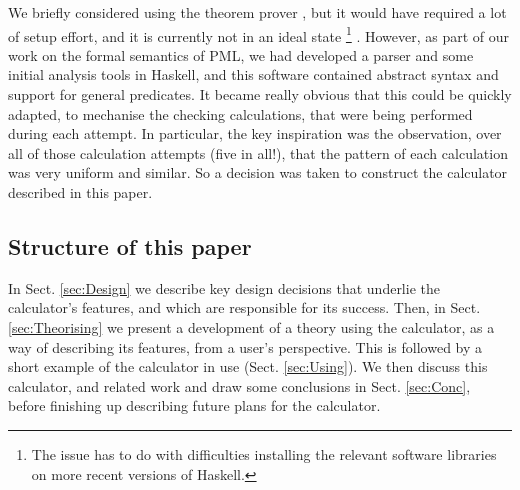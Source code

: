We briefly considered using the  theorem prover
\cite{DBLP:conf/utp/Butterfield10,DBLP:conf/utp/Butterfield12},
but it would have required a lot of setup effort,
and it is currently not in an ideal state%
\footnote{The issue has to do with difficulties installing
the relevant software libraries
on more recent versions of Haskell.}
.
However, as part of our work on the formal semantics of PML,
we had developed a parser and some initial analysis tools
in Haskell\cite{Haskell2010},
and this software contained abstract syntax and support
for general predicates.
It became really obvious that this could be quickly adapted,
to mechanise the checking calculations, that were being performed
during each attempt.
In particular,
the key inspiration was the observation,
over all of those calculation attempts (five in all!),
that the pattern of each calculation was very uniform and similar.
So a decision was taken to construct the calculator described in this paper.



\subsection{Structure of this paper}

In Sect. \ref{sec:Design}
we describe key design decisions
that underlie the calculator's features,
and which are responsible for its success.
Then, in Sect. \ref{sec:Theorising}
we present a development of a theory using the calculator,
as a way of describing its features, from a user's perspective.
This is followed by a short example of the calculator in use
(Sect. \ref{sec:Using}).
We then discuss this calculator, and related work
and draw some conclusions in Sect. \ref{sec:Conc},
before finishing up describing future plans for the calculator.
